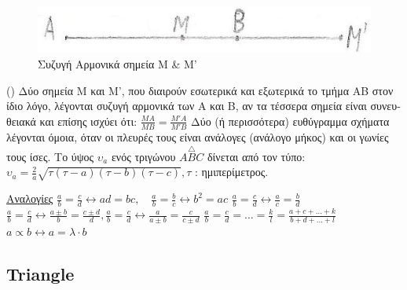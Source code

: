 \documentclass[12pt]{article}
\begin{document}
\begin{flushleft}
	\begin{figure}[H]
	\centering
	\includegraphics[scale=2]{sizigiArmonika}
	\caption{\textgreek{Συζυγή Αρμονικά σημεία Μ \& Μ'}}
	\label{fig:sizigiArmonika}
	\end{figure}
	
	\textbullet \quad () \textgreek{Δύο σημεία Μ και Μ', που διαιρούν εσωτερικά και εξωτερικά το τμήμα ΑΒ στον ίδιο λόγο, λέγονται συζυγή αρμονικά των Α και Β, αν τα τέσσερα σημεία είναι συνευθειακά και επίσης ισχύει ότι: } $\displaystyle  \frac{MA}{MB} = \frac{M'A}{M'B} $ \linebreak 
	\textbullet \quad \textgreek{Δύο (ή περισσότερα) ευθύγραμμα σχήματα λέγονται όμοια, όταν οι πλευρές τους είναι ανάλογες (ανάλογο μήκος) και οι γωνίες τους ίσες.} \linebreak
	\textbullet \quad \textgreek{Το ύψος} $\upsilon_a$ \textgreek{ενός τριγώνου } $\displaystyle A\overset{\triangle}{B}C$ \textgreek{ δίνεται από τον τύπο:} $\displaystyle \upsilon_a = \frac{2}{a}\sqrt{\tau(\tau -a)(\tau -b)(\tau -c)} , \tau$ \textgreek{: ημιπερίμετρος.} \linebreak 
	
	\uline{\textgreek{Αναλογίες}} \linebreak 
	\textbullet \quad $\displaystyle \frac{a}{b} = \frac{c}{d} \leftrightarrow ad = bc , \quad \frac{a}{b} = \frac{b}{c} \leftrightarrow b^2 = ac $ \linebreak 
	\textbullet \quad $\displaystyle \frac{a}{b} = \frac{c}{d} \leftrightarrow \frac{a}{c} = \frac{b}{d} $ \linebreak 
	\textbullet \quad $\displaystyle \frac{a}{b} = \frac{c}{d} \leftrightarrow \frac{a \pm b}{b} = \frac{c \pm d}{d}, \frac{a}{b} = \frac{c}{d} \leftrightarrow \frac{a}{a \pm b}= \frac{c}{c \pm d} $ \linebreak 
	\textbullet \quad $\displaystyle \frac{a}{b} = \frac{c}{d} = \ldots = \frac{k}{l} = \frac{a+c+\ldots +k}{b+d+\ldots + l} $ \linebreak 
	\textbullet \quad $\displaystyle  a \varpropto b \leftrightarrow a = \lambda \cdot b $ \linebreak 
	
		
	\subsection{Triangle} 
	

\end{flushleft}
\end{document}
